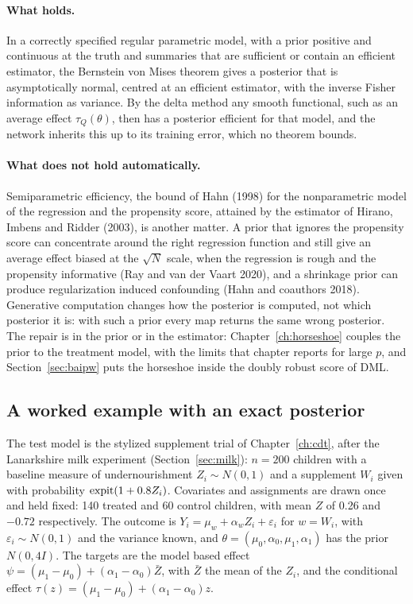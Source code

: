 \paragraph{What holds.} In a correctly specified regular parametric model, with a prior positive and continuous at the truth and summaries that are sufficient or contain an efficient estimator, the Bernstein von Mises theorem gives a posterior that is asymptotically normal, centred at an efficient estimator, with the inverse Fisher information as variance. By the delta method any smooth functional, such as an average effect $\tau_Q(\theta)$, then has a posterior efficient for that model, and the network inherits this up to its training error, which no theorem bounds.

\paragraph{What does not hold automatically.} Semiparametric efficiency, the bound of Hahn (1998) for the nonparametric model of the regression and the propensity score, attained by the estimator of Hirano, Imbens and Ridder (2003), is another matter. A prior that ignores the propensity score can concentrate around the right regression function and still give an average effect biased at the $\sqrt N$ scale, when the regression is rough and the propensity informative (Ray and van der Vaart 2020), and a shrinkage prior can produce regularization induced confounding (Hahn and coauthors 2018). Generative computation changes how the posterior is computed, not which posterior it is: with such a prior every map returns the same wrong posterior. The repair is in the prior or in the estimator: Chapter~\ref{ch:horseshoe} couples the prior to the treatment model, with the limits that chapter reports for large $p$, and Section~\ref{sec:baipw} puts the horseshoe inside the doubly robust score of DML.

\subsection{A worked example with an exact posterior}

The test model is the stylized supplement trial of Chapter~\ref{ch:cdt}, after the Lanarkshire milk experiment (Section~\ref{sec:milk}): $n=200$ children with a baseline measure of undernourishment $Z_i\sim N(0,1)$ and a supplement $W_i$ given with probability $\operatorname{expit}(1+0.8Z_i)$. Covariates and assignments are drawn once and held fixed: 140 treated and 60 control children, with mean $Z$ of 0.26 and $-0.72$ respectively. The outcome is $Y_i=\mu_w+\alpha_wZ_i+\varepsilon_i$ for $w=W_i$, with $\varepsilon_i\sim N(0,1)$ and the variance known, and $\theta=(\mu_0,\alpha_0,\mu_1,\alpha_1)$ has the prior $N(0,4I)$. The targets are the model based effect $\psi=(\mu_1-\mu_0)+(\alpha_1-\alpha_0)\bar Z$, with $\bar Z$ the mean of the $Z_i$, and the conditional effect $\tau(z)=(\mu_1-\mu_0)+(\alpha_1-\alpha_0)z$.

